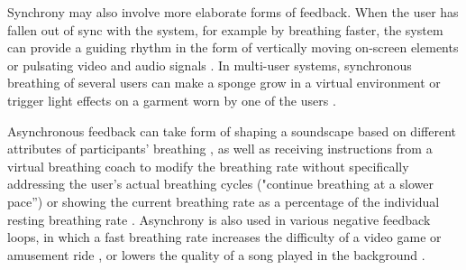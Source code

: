 Synchrony may also involve more elaborate forms of feedback. When the user has fallen out of sync with the system, for example by breathing faster, the system can provide a guiding rhythm in the form of vertically moving on-screen elements \cite{moraveji_peripheral_2011} or pulsating video and audio signals \cite{ghandeharioun_brightbeat_2017}. In multi-user systems, synchronous breathing of several users can make a sponge grow in a virtual environment \cite{desnoyers-stewart_jel_2019} or trigger light effects on a garment worn by one of the users \cite{schiphorst_breath_2006}.

Asynchronous feedback can take form of shaping a soundscape based on different attributes of participants' breathing \cite{vidyarthi_sonic_2012}, as well as receiving instructions from a virtual breathing coach to modify the breathing rate without specifically addressing the user's actual breathing cycles ("continue breathing at a slower pace”) \cite{shamekhi_breathe_2018} or showing the current breathing rate as a percentage of the individual resting breathing rate \cite{moraveji_breathtray_2012}. Asynchrony is also used in various negative feedback loops, in which a fast breathing rate increases the difficulty of a video game \cite{parnandi_chill-out_2014} or amusement ride \cite{marshall_breath_2011}, or lowers the quality of a song played in the background \cite{harris_sonic_2014}.


